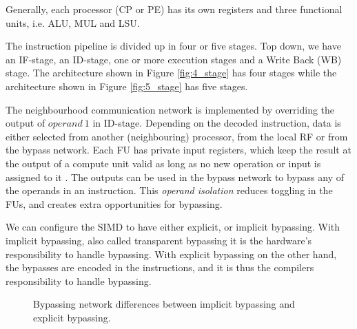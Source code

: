 Generally, each processor (CP or PE) has its own registers and three functional units, i.e. ALU, MUL and LSU. 

The instruction pipeline is divided up in four or five stages. Top down, we have an IF-stage, an ID-stage, one or more execution stages and a Write Back (WB) stage. The architecture shown in Figure \ref{fig:4_stage} has four stages while the architecture shown in Figure \ref{fig:5_stage} has five stages.

The neighbourhood communication network is implemented by overriding the output of $operand\ 1$ in ID-stage. Depending on the decoded instruction, data is either selected from another (neighbouring) processor, from the local RF or from the bypass network. Each FU has private input registers, which keep the result at the output of a compute unit valid as long as no new operation or input is assigned to it \cite{dongrio1}. The outputs can be used in the bypass network to bypass any of the operands in an instruction. This \emph{operand isolation} reduces toggling in the FUs, and creates extra opportunities for bypassing.

We can configure the SIMD to have either explicit, or implicit bypassing. With implicit bypassing, also called transparent bypassing it is the hardware's responsibility to handle bypassing. With explicit bypassing on the other hand, the bypasses are encoded in the instructions, and it is thus the compilers responsibility to handle bypassing.

\begin{figure}[t]
\centering
{}
\hfil
{}
\caption{Bypassing network differences between implicit bypassing and explicit bypassing.}
\label{fig:datapath_approaches}
\end{figure}

